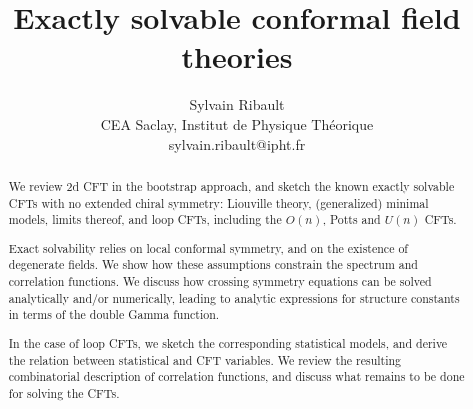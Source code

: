 \documentclass[12pt, a4paper]{article}
\title{\bfseries Exactly solvable conformal field theories}
\author{Sylvain Ribault \vspace{2mm}
\\
{\normalsize CEA Saclay, Institut de Physique Th\'eorique}
 \\
 {\footnotesize \ttfamily sylvain.ribault@ipht.fr }
}
\theoremstyle{break}
\begin{document}
\maketitle


\begin{abstract}
We review 2d CFT in the bootstrap approach, and sketch the known exactly solvable CFTs with no extended chiral symmetry: Liouville theory, (generalized) minimal models, limits thereof, and loop CFTs, including the $O(n)$, Potts and $U(n)$ CFTs. 

Exact solvability relies on local conformal symmetry, and on the existence of degenerate fields. We show how these assumptions constrain the spectrum and correlation functions. We discuss how crossing symmetry equations can be solved analytically and/or numerically, leading to analytic expressions for structure constants in terms of the double Gamma function.  





In the case of loop CFTs, we sketch the corresponding statistical models, and derive the relation between statistical and CFT variables. We review the resulting combinatorial description of correlation functions, and discuss what remains to be done for solving the CFTs. 
\end{abstract}
\end{document}
